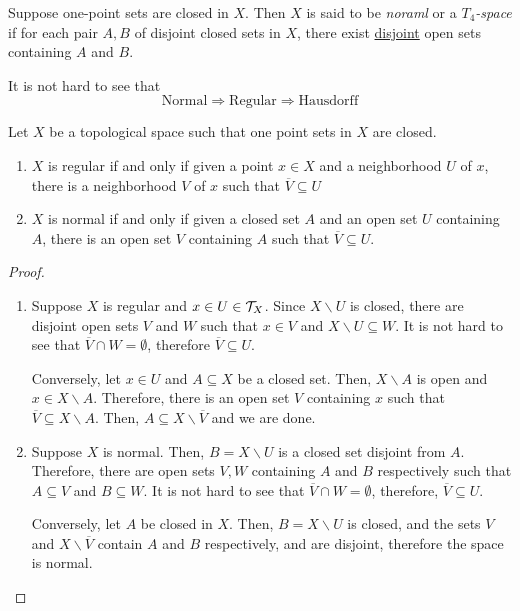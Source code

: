 \begin{definition}
    Suppose one-point sets are closed in $X$. Then $X$ is said to be \textit{noraml} or a \textit{$T_4$-space} if for each pair $A,B$ of disjoint closed sets in $X$, there exist \underline{disjoint} open sets containing $A$ and $B$.
\end{definition}

It is not hard to see that 
\begin{equation*}
    \text{Normal}\Longrightarrow\text{Regular}\Longrightarrow\text{Hausdorff}
\end{equation*}

\begin{theorem}
    Let $X$ be a topological space such that one point sets in $X$ are closed. 
    \begin{enumerate}
        \item $X$ is regular if and only if given a point $x\in X$ and a neighborhood $U$ of $x$, there is a neighborhood $V$ of $x$ such that $\overline{V}\subseteq U$

        \item $X$ is normal if and only if given a closed set $A$ and an open set $U$ containing $A$, there is an open set $V$ containing $A$ such that $\overline{V}\subseteq U$.
    \end{enumerate}
\end{theorem}
\begin{proof}
    \hfill 
    \begin{enumerate}
        \item Suppose $X$ is regular and $x\in U\in \mathcal{T}_X$. Since $X\backslash U$ is closed, there are disjoint open sets $V$ and $W$ such that $x\in V$ and $X\backslash U\subseteq W$. It is not hard to see that $\overline{V}\cap W = \emptyset$, therefore $\overline{V}\subseteq U$.

        Conversely, let $x\in U$ and $A\subseteq X$ be a closed set. Then, $X\backslash A$ is open and $x\in X\backslash A$. Therefore, there is an open set $V$ containing $x$ such that $\overline{V}\subseteq X\backslash A$. Then, $A\subseteq X\backslash\overline{V}$ and we are done.

        \item Suppose $X$ is normal. Then, $B = X\backslash U$ is a closed set disjoint from $A$. Therefore, there are open sets $V, W$ containing $A$ and $B$ respectively such that $A\subseteq V$ and $B\subseteq W$. It is not hard to see that $\overline{V}\cap W = \emptyset$, therefore, $\overline{V}\subseteq U$.

        Conversely, let $A$ be closed in $X$. Then, $B = X\backslash U$ is closed, and the sets $V$ and $X\backslash\overline{V}$ contain $A$ and $B$ respectively, and are disjoint, therefore the space is normal.
    \end{enumerate}
\end{proof}

